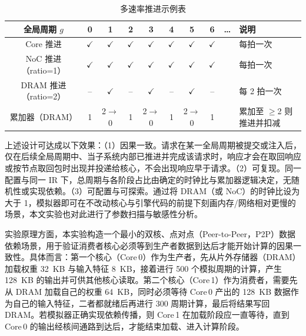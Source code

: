 \begin{table}[htbp]
  \centering
  \caption{多速率推进示例表}
  \label{tab:c4_cdc_timeline}
  \small
  \begin{tabular*}{\textwidth}{@{\extracolsep{\fill}}cccccccccl}
    \toprule
    全局周期 $g$ & 0 & 1 & 2 & 3 & 4 & 5 & 6 & \ldots & 说明 \\
    \midrule
    Core 推进 & $\checkmark$ & $\checkmark$ & $\checkmark$ & $\checkmark$ & $\checkmark$ & $\checkmark$ & $\checkmark$ & & 每拍一次 \\
    NoC 推进（ratio=1） & $\checkmark$ & $\checkmark$ & $\checkmark$ & $\checkmark$ & $\checkmark$ & $\checkmark$ & $\checkmark$ & & 每拍一次 \\
    DRAM 推进（ratio=2） & -- & $\checkmark$ & -- & $\checkmark$ & -- & $\checkmark$ & -- & & 每 2 拍一次 \\
    累加器（DRAM） & 1 & 2$\to$0 & 1 & 2$\to$0 & 1 & 2$\to$0 & 1 & & 累加至 $\ge$2 则推进并扣减 \\
    \bottomrule
  \end{tabular*}
\end{table}

上述设计可达成以下效果：（1）因果一致。请求在某一全局周期被提交或注入后，仅在后续全局周期中、当子系统内部已推进并完成该请求时，响应才会在取回响应或按节点取回包时出现并投递给核心，不会出现响应早于请求。（2）可复现。同一配置与同一 IR 下，总周期与各阶段占比由确定的时钟比与累加器逻辑决定，无随机性或实现依赖。（3）可配置与可探索。通过将 DRAM（或 NoC）的时钟比设为大于 1，模拟器即可在不改动核心与引擎代码的前提下刻画内存/网络相对更慢的场景，本文实验也对此进行了参数扫描与敏感性分析。

\label{sec:c3_accuracy}

\label{subsec:c3_mb1}

实验原理方面，本实验构造一个最小的双核、点对点（Peer-to-Peer，P2P）数据依赖场景，用于验证消费者核心必须等到生产者数据到达后才能开始计算的因果一致性。具体而言：第一个核心（Core\,0）作为生产者，先从片外存储器（DRAM）加载权重 \SI{32}{KB} 与输入特征 \SI{8}{KB}，接着进行 500 个模拟周期的计算，产生 \SI{128}{KB} 的输出并可供其他核心读取。第二个核心（Core\,1）作为消费者，需要先从 DRAM 加载自己的权重 \SI{64}{KB}，同时必须等待 Core\,0 产出的 \SI{128}{KB} 数据作为自己的输入特征，二者都就绪后再进行 300 周期计算，最后将结果写回 DRAM。若模拟器正确实现依赖传播，则 Core\,1 在加载阶段应一直等待，直到 Core\,0 的输出经核间通路到达后，才能结束加载、进入计算阶段。

